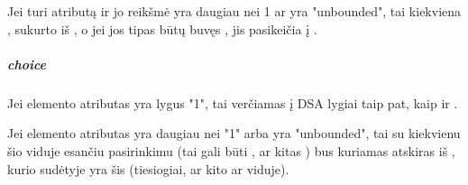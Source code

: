 \documentclass[letterpaper,10pt,lithuanian]{sphinxmanual}
\begin{document}
\sphinxAtStartPar
Jei  turi atributą {\hyperref[\detokenize{schemos/xsd:xsd-maxoccurs}]{}} ir jo reikšmė yra daugiau nei 1 ar yra "unbounded",
tai kiekviena {\hyperref[\detokenize{formatas:property}]{}}, sukurto iš , o jei jos tipas būtų buvęs , jis pasikeičia į .


\subparagraph{choice}
\label{\detokenize{schemos/xsd:choice}}\label{\detokenize{schemos/xsd:xsd-choice}}
\sphinxAtStartPar
Jei  elemento atributas {\hyperref[\detokenize{schemos/xsd:xsd-maxoccurs}]{}} yra lygus "1", tai  verčiamas į DSA lygiai
taip pat, kaip ir {\hyperref[\detokenize{schemos/xsd:xsd-sequence}]{}}.

\sphinxAtStartPar
Jei  elemento atributas {\hyperref[\detokenize{schemos/xsd:xsd-maxoccurs}]{}} yra daugiau nei "1" arba yra "unbounded", tai su
kiekvienu šio  viduje esančiu pasirinkimu (tai gali būti {\hyperref[\detokenize{schemos/xsd:xsd-element}]{}}, {\hyperref[\detokenize{schemos/xsd:xsd-sequence}]{}}
ar kitas ) bus kuriamas atskiras {\hyperref[\detokenize{formatas:model}]{}} iš {\hyperref[\detokenize{schemos/xsd:xsd-complextype}]{}}, kurio sudėtyje yra šis
 (tiesiogiai, ar kito {\hyperref[\detokenize{schemos/xsd:xsd-sequence}]{}} ar  viduje).
\end{document}
